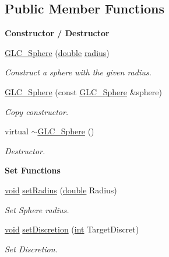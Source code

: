 \subsection*{Public Member Functions}
\begin{Indent}{\bf Constructor / Destructor}\par
\begin{DoxyCompactItemize}
\item 
\hyperlink{class_g_l_c___sphere_ab36e208b66b125205a32889270752b1d}{G\-L\-C\-\_\-\-Sphere} (\hyperlink{_super_l_u_support_8h_a8956b2b9f49bf918deed98379d159ca7}{double} \hyperlink{class_g_l_c___sphere_a69b0f8d96a6b0c80503fdc7bb15db472}{radius})
\begin{DoxyCompactList}\small\item\em Construct a sphere with the given radius. \end{DoxyCompactList}\item 
\hyperlink{class_g_l_c___sphere_a6d0473ce6b1e89498998b3d0b8de9b36}{G\-L\-C\-\_\-\-Sphere} (const \hyperlink{class_g_l_c___sphere}{G\-L\-C\-\_\-\-Sphere} \&sphere)
\begin{DoxyCompactList}\small\item\em Copy constructor. \end{DoxyCompactList}\item 
virtual \hyperlink{class_g_l_c___sphere_a4c1c57542ffd0d22f61591f5b9716326}{$\sim$\-G\-L\-C\-\_\-\-Sphere} ()
\begin{DoxyCompactList}\small\item\em Destructor. \end{DoxyCompactList}\end{DoxyCompactItemize}
\end{Indent}
\begin{Indent}{\bf Set Functions}\par
\begin{DoxyCompactItemize}
\item 
\hyperlink{group___u_a_v_objects_plugin_ga444cf2ff3f0ecbe028adce838d373f5c}{void} \hyperlink{class_g_l_c___sphere_aae7578d94f2a25cd1bf695f8081bcda5}{set\-Radius} (\hyperlink{_super_l_u_support_8h_a8956b2b9f49bf918deed98379d159ca7}{double} Radius)
\begin{DoxyCompactList}\small\item\em Set Sphere radius. \end{DoxyCompactList}\item 
\hyperlink{group___u_a_v_objects_plugin_ga444cf2ff3f0ecbe028adce838d373f5c}{void} \hyperlink{class_g_l_c___sphere_ac389f42123b54b86030b428948486ca0}{set\-Discretion} (\hyperlink{ioapi_8h_a787fa3cf048117ba7123753c1e74fcd6}{int} Target\-Discret)
\begin{DoxyCompactList}\small\item\em Set Discretion. \end{DoxyCompactList}\end{DoxyCompactItemize}
\end{Indent}

